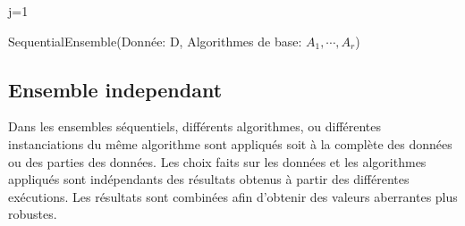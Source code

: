 \begin{algorithm}
\SetAlgoLined
j=1\;
\caption{SequentialEnsemble(Donnée: D,
	Algorithmes de base: $A_1,\cdots,A_r$)}
\end{algorithm}%
\subsection*{Ensemble independant}
Dans les ensembles séquentiels, différents algorithmes, ou différentes instanciations
du même algorithme sont appliqués soit à la complète
des données ou des parties des données. Les choix faits sur les données
et les algorithmes appliqués sont indépendants des résultats obtenus
à partir des différentes exécutions. Les résultats sont combinées afin d'obtenir des valeurs aberrantes plus robustes.

